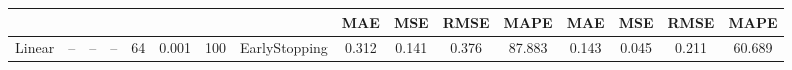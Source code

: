 \begin{table}[h!]
{\begin{tabular}{cccccccccccccccc}
                                                                              &                                                                                 &                                                                                  &                                                                                &                                                                       &                                                                          &                         &                                                                                & MAE                                                                       & MSE                                                                       & RMSE                                                                      & MAPE                                                                            & MAE                                                                       & MSE                                                                       & RMSE                                                                      & MAPE                                                                            \\ \hline
Linear                                                                        & --                                                                             & --                                                                              & --                                                                            & 64                                                                    & 0.001                                                                    & 100                     & EarlyStopping                                                                  & 0.312                                                                     & 0.141                                                                     & 0.376                                                                     & 87.883                                                                          & 0.143                                                                     & 0.045                                                                     & 0.211                                                                     & 60.689                                                                          \\ \hline

\end{tabular}}
\end{table}

